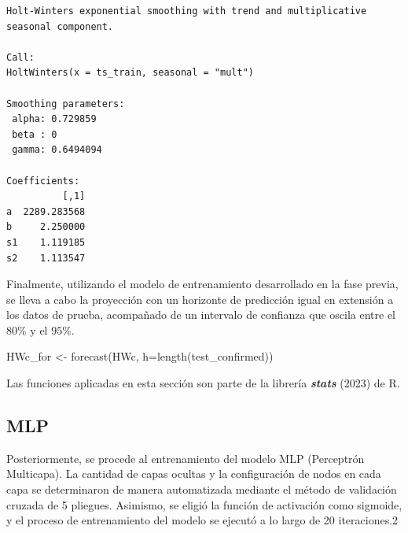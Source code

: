 \documentclass[
  letterpaper,
  DIV=11,
  numbers=noendperiod]{scrreport}
\newenvironment{Shaded}{\begin{snugshade}}{\end{snugshade}}
\newcommand{\AttributeTok}[1]{\textcolor[rgb]{0.40,0.45,0.13}{#1}}
\newcommand{\FunctionTok}[1]{\textcolor[rgb]{0.28,0.35,0.67}{#1}}
\newcommand{\NormalTok}[1]{\textcolor[rgb]{0.00,0.23,0.31}{#1}}
\newcommand{\OtherTok}[1]{\textcolor[rgb]{0.00,0.23,0.31}{#1}}
\theoremstyle{plain}
\theoremstyle{definition}
\theoremstyle{definition}
\theoremstyle{plain}
\theoremstyle{remark}
\begin{document}
\begin{verbatim}
Holt-Winters exponential smoothing with trend and multiplicative seasonal component.

Call:
HoltWinters(x = ts_train, seasonal = "mult")

Smoothing parameters:
 alpha: 0.729859
 beta : 0
 gamma: 0.6494094

Coefficients:
          [,1]
a  2289.283568
b     2.250000
s1    1.119185
s2    1.113547
\end{verbatim}

Finalmente, utilizando el modelo de entrenamiento desarrollado en la
fase previa, se lleva a cabo la proyección con un horizonte de
predicción igual en extensión a los datos de prueba, acompañado de un
intervalo de confianza que oscila entre el \(80\%\) y el \(95\%\).

\begin{Shaded}
\begin{Highlighting}[]
\NormalTok{HWc\_for }\OtherTok{\textless{}{-}} \FunctionTok{forecast}\NormalTok{(HWc, }\AttributeTok{h=}\FunctionTok{length}\NormalTok{(test\_confirmed))}
\end{Highlighting}
\end{Shaded}

\begin{tcolorbox}[enhanced jigsaw, titlerule=0mm, left=2mm, opacityback=0, toprule=.15mm, colframe=quarto-callout-note-color-frame, bottomrule=.15mm, breakable, coltitle=black, opacitybacktitle=0.6, bottomtitle=1mm, colback=white, arc=.35mm, leftrule=.75mm, toptitle=1mm, colbacktitle=quarto-callout-note-color!10!white, title=\textcolor{quarto-callout-note-color}{\faInfo}\hspace{0.5em}{Nota}, rightrule=.15mm]

Las funciones aplicadas en esta sección son parte de la librería
\textbf{\emph{stats}} (2023) de R.

\end{tcolorbox}

\subsection{MLP}\label{mlp-1}

Posteriormente, se procede al entrenamiento del modelo MLP (Perceptrón
Multicapa). La cantidad de capas ocultas y la configuración de nodos en
cada capa se determinaron de manera automatizada mediante el método de
validación cruzada de 5 pliegues. Asimismo, se eligió la función de
activación como sigmoide, y el proceso de entrenamiento del modelo se
ejecutó a lo largo de 20 iteraciones.2
\end{document}
